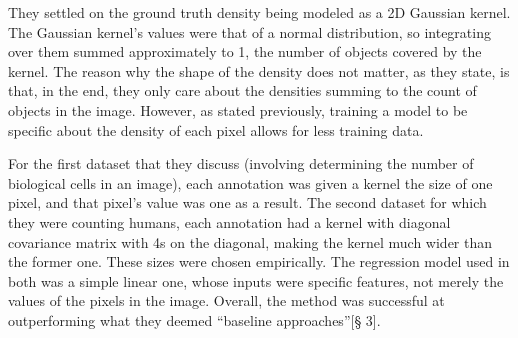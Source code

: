 They settled on the ground truth density being modeled as a 2D Gaussian kernel. The Gaussian
kernel's values were that of a normal distribution, so integrating over them summed approximately to
1, the number of objects covered by the kernel. The reason why the shape of the density does not matter, as
they state, is that, in the end, they only care about the densities summing to the count of objects
in the image. However, as stated previously, training a model to be specific about the density of
each pixel allows for less training data.

For the first dataset that they discuss (involving determining the number of biological cells in an
image), each annotation was given a kernel the size of one pixel, and that pixel's value was one as
a result. The second dataset for which they were counting humans, each annotation had a kernel with
diagonal covariance matrix with 4s on the diagonal, making the kernel much wider than the former
one. These sizes were chosen empirically. The regression model used in both was a simple linear one, whose
inputs were specific features, not merely the values of the pixels in the image. Overall, the method
was successful at outperforming what they deemed ``baseline approaches''\cite{learningtocount}[§ 3].